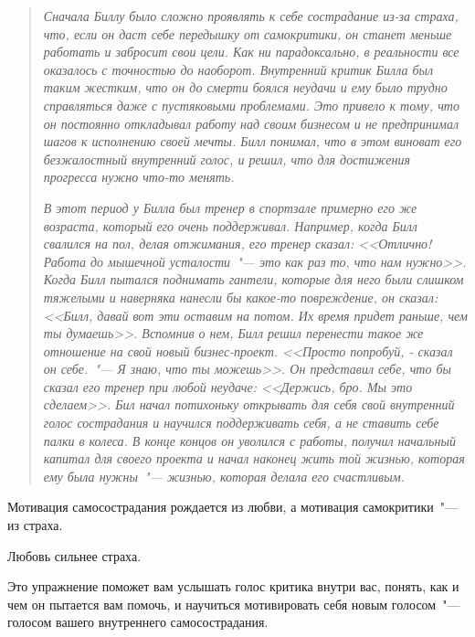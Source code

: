 \begin{quotation}
	\textit{Сначала Биллу было сложно проявлять к себе сострадание из-за страха, что, если он даст себе передышку от самокритики, он станет меньше работать и забросит свои цели. Как ни парадоксально, в реальности все оказалось с точностью до наоборот. Внутренний критик Билла был таким жестким, что он до смерти боялся неудачи и ему было трудно справляться даже с пустяковыми проблемами. Это привело к тому, что он постоянно откладывал работу над своим бизнесом и не предпринимал шагов к исполнению своей мечты. Билл понимал, что в этом виноват его безжалостный внутренний голос, и решил, что для достижения прогресса нужно что-то менять.}
	
	\textit{В этот период у Билла был тренер в спортзале примерно его же возраста, который его очень поддерживал. Например, когда Билл свалился на пол, делая отжимания, его тренер сказал: <<Отлично! Работа до мышечной усталости~"--- это как раз то, что нам нужно>>. Когда Билл пытался поднимать гантели, которые для него были слишком тяжелыми и наверняка нанесли бы какое-то повреждение, он сказал: <<Билл, давай вот эти оставим на потом. Их время придет раньше, чем ты думаешь>>. Вспомнив о нем, Билл решил перенести такое же отношение на свой новый бизнес-проект. <<Просто попробуй, - сказал он себе.~"--- Я знаю, что ты можешь>>. Он представил себе, что бы сказал его тренер при любой неудаче: <<Держись, бро. Мы это сделаем>>. Бил начал потихоньку открывать для себя свой внутренний голос сострадания и научился поддерживать себя, а не ставить себе палки в колеса. В конце концов он уволился с работы, получил начальный капитал для своего проекта и начал наконец жить той жизнью, которая ему была нужны~"--- жизнью, которая делала его счастливым.}
\end{quotation}

\vspace{4ex}

\begin{center}
	{\Large Мотивация самосострадания рождается из любви, а мотивация самокритики~"--- из страха.}
	
	\vspace{1ex}
	
	{\Large	Любовь сильнее страха.}
\end{center}

\newpage
{}

Это упражнение поможет вам услышать голос критика внутри вас, понять, как и чем он пытается вам помочь, и научиться мотивировать себя новым голосом~"--- голосом вашего внутреннего самосострадания. 

